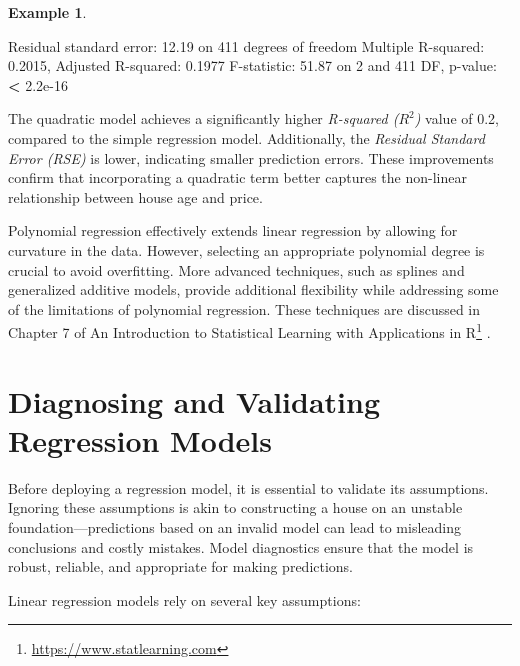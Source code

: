 \documentclass[
  11pt,
]{book}
\makeatletter
\newenvironment{Shaded}{}{}
\newcommand{\DecValTok}[1]{#1}
\newcommand{\ErrorTok}[1]{\textcolor[rgb]{0.21,0.21,0.21}{\textbf{#1}}}
\newcommand{\FloatTok}[1]{#1}
\newcommand{\NormalTok}[1]{#1}
\newcommand{\SpecialCharTok}[1]{\textcolor[rgb]{0.39,0.39,0.39}{#1}}
\renewcommand{\href}[2]{#2\footnote{\url{#1}}}
\newenvironment{kframe}{%
\medskip{}
\setlength{\fboxsep}{.8em}
 \def\at@end@of@kframe{}%
 \ifinner\ifhmode%
  \def\at@end@of@kframe{\end{minipage}}%
  \begin{minipage}{\columnwidth}%
 \fi\fi%
 \def\FrameCommand##1{\hskip\@totalleftmargin \hskip-\fboxsep
 \colorbox{shadecolor}{##1}\hskip-\fboxsep
     \hskip-\linewidth \hskip-\@totalleftmargin \hskip\columnwidth}%
 \MakeFramed {\advance\hsize-\width
   \@totalleftmargin\z@ \linewidth\hsize
   \@setminipage}}%
 {\par\unskip\endMakeFramed%
 \at@end@of@kframe}
\renewenvironment{Shaded}{\begin{kframe}}{\end{kframe}}
\theoremstyle{definition}
\theoremstyle{definition}
\newtheorem{example}{Example}[chapter]
\theoremstyle{definition}
\theoremstyle{definition}
\theoremstyle{remark}
\makeatother
\begin{document}
\begin{example}
\begin{Shaded}
\begin{Highlighting}[]
\NormalTok{   Residual standard error}\SpecialCharTok{:} \FloatTok{12.19}\NormalTok{ on }\DecValTok{411}\NormalTok{ degrees of freedom}
\NormalTok{   Multiple R}\SpecialCharTok{{-}}\NormalTok{squared}\SpecialCharTok{:}  \FloatTok{0.2015}\NormalTok{, Adjusted R}\SpecialCharTok{{-}}\NormalTok{squared}\SpecialCharTok{:}  \FloatTok{0.1977} 
\NormalTok{   F}\SpecialCharTok{{-}}\NormalTok{statistic}\SpecialCharTok{:} \FloatTok{51.87}\NormalTok{ on }\DecValTok{2}\NormalTok{ and }\DecValTok{411}\NormalTok{ DF,  p}\SpecialCharTok{{-}}\NormalTok{value}\SpecialCharTok{:} \ErrorTok{\textless{}} \FloatTok{2.2e{-}16}
\end{Highlighting}
\end{Shaded}

The quadratic model achieves a significantly higher \emph{R-squared (\(R^2\))} value of 0.2, compared to the simple regression model. Additionally, the \emph{Residual Standard Error (RSE)} is lower, indicating smaller prediction errors. These improvements confirm that incorporating a quadratic term better captures the non-linear relationship between house age and price.
\end{example}

Polynomial regression effectively extends linear regression by allowing for curvature in the data. However, selecting an appropriate polynomial degree is crucial to avoid overfitting. More advanced techniques, such as splines and generalized additive models, provide additional flexibility while addressing some of the limitations of polynomial regression. These techniques are discussed in Chapter 7 of \href{https://www.statlearning.com}{An Introduction to Statistical Learning with Applications in R} \citep{gareth2013introduction}.

\section{Diagnosing and Validating Regression Models}\label{diagnosing-and-validating-regression-models}

Before deploying a regression model, it is essential to validate its assumptions. Ignoring these assumptions is akin to constructing a house on an unstable foundation---predictions based on an invalid model can lead to misleading conclusions and costly mistakes. Model diagnostics ensure that the model is robust, reliable, and appropriate for making predictions.

Linear regression models rely on several key assumptions:
\end{document}
